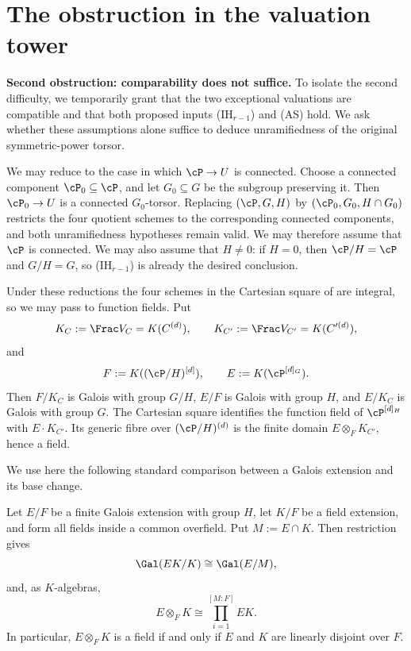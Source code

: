\section{The obstruction in the valuation tower}
\label{sec:as_induction_valuation_tower}

{\color{blue}
\noindent\textbf{Second obstruction: comparability does not suffice.}
To isolate the second difficulty, we temporarily grant that the two
exceptional valuations are compatible and that both proposed inputs
(IH$_{r-1}$) and (AS) hold. We ask whether these assumptions alone suffice
to deduce unramifiedness of the original symmetric-power torsor.
\par}

We may reduce to the case in which $\cP\to U$ is connected. Choose a
connected component $\cP_0\subseteq\cP$, and let $G_0\subseteq G$ be the
subgroup preserving it. Then $\cP_0\to U$ is a connected $G_0$-torsor.
Replacing $(\cP,G,H)$ by $(\cP_0,G_0,H\cap G_0)$ restricts the four quotient
schemes to the corresponding connected components, and both unramifiedness
hypotheses remain valid. We may therefore assume that $\cP$ is connected.
We may also assume that $H\ne0$: if $H=0$, then $\cP/H=\cP$ and $G/H=G$,
so (IH$_{r-1}$) is already the desired conclusion.

Under these reductions the four schemes in the Cartesian square of
 are integral, so we may pass to function
fields. Put
\[
K_C:=\Frac V_C=K(C^{(d)}),\qquad
K_{C'}:=\Frac V_{C'}=K(C'^{(d)}),
\]
and
\[
F:=K((\cP/H)^{[d]}),\qquad
E:=K(\cP^{[d]_G}).
\]
Then $F/K_C$ is Galois with group $G/H$, $E/F$ is Galois with group $H$,
and $E/K_C$ is Galois with group $G$. The Cartesian square identifies the
function field of $\cP^{[d]_H}$ with $E\cdot K_{C'}$. Its generic fibre over
$(\cP/H)^{(d)}$ is the finite domain $E\otimes_FK_{C'}$, hence a field.

We use here the following standard comparison between a Galois extension and
its base change.

\begin{lemma}\label{lem:galois-base-change}
Let $E/F$ be a finite Galois extension with group $H$, let $K/F$ be a field
extension, and form all fields inside a common overfield. Put $M:=E\cap K$.
Then restriction gives
\[
\Gal(EK/K)\cong\Gal(E/M),
\]
and, as $K$-algebras,
\[
E\otimes_FK\cong\prod_{i=1}^{[M:F]}EK.
\]
In particular, $E\otimes_FK$ is a field if and only if $E$ and $K$ are
linearly disjoint over $F$.
\end{lemma}

